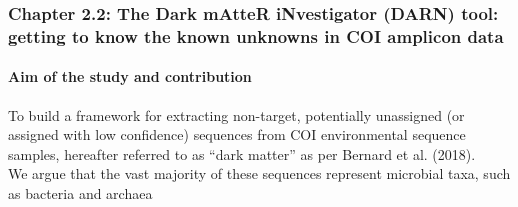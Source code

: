 \documentclass{beamer}
\begin{document}
   \begin{darkframes}
      \begin{frame}
         \frametitle{\textbf{Chapter 2.2}: The Dark mAtteR iNvestigator (DARN) tool: getting to know
         the known unknowns in COI amplicon data}
         \framesubtitle{Aim of the study and contribution}


         To build a framework for extracting non-target, potentially unassigned 
         (or assigned with low confidence) sequences from COI environmental
         sequence samples, hereafter referred to as “dark matter” as per Bernard et al. (2018). \\
         \bigskip
         We argue that the vast majority of these sequences represent
         microbial taxa, such as bacteria and archaea

      \end{frame}
   \end{darkframes}
\end{document}
